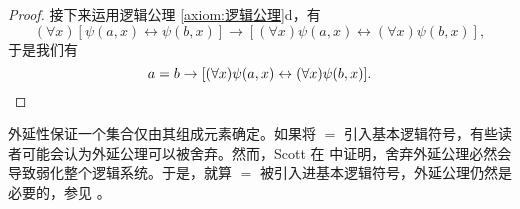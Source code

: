 \begin{proof}
  接下来运用逻辑公理 \ref{axiom:逻辑公理}d，有
  \begin{equation*}
    (\forall x)[\psi(a,x)\leftrightarrow \psi(b,x)]\to
    [(\forall x)\psi(a,x)\leftrightarrow (\forall x)\psi(b,x)],
  \end{equation*}
  于是我们有
  \begin{equation*}
    a=b\to[(\forall x)\psi(a,x)\leftrightarrow (\forall x)\psi(b,x)].\qedhere
  \end{equation*}
\end{proof}

\begin{remark}
  外延性保证一个集合仅由其组成元素确定。如果将 \(=\) 引入基本逻辑符号，有些读者可能会认为外延公理可以被舍弃。然而，Scott 在 \cite[pp. 115--131]{scott62} 中证明，舍弃外延公理必然会导致弱化整个逻辑系统。于是，就算 \(=\) 被引入进基本逻辑符号，外延公理仍然是必要的，参见 \cite{quine69}。
\end{remark}